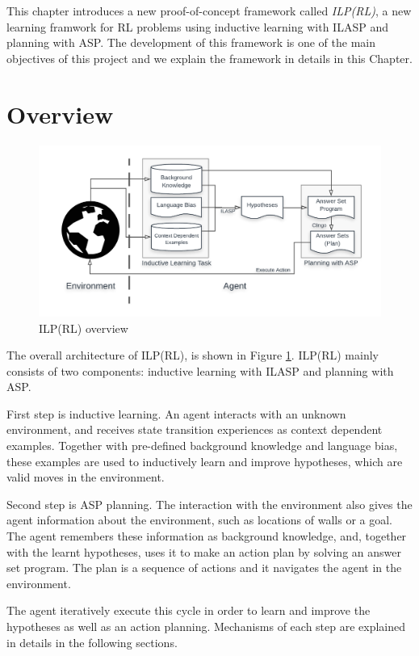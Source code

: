 This chapter introduces a new proof-of-concept framework called \textit{ILP(RL)}, a new learning framwork for RL problems using inductive learning with ILASP and planning with ASP.
The development of this framework is one of the main objectives of this project and we explain the framework in details in this Chapter.

\section{Overview}
\label{sec:overview}

\begin{figure}[!htb]
\centering
\includegraphics[width=1.0\textwidth]{./figures/architecture}
\caption{ILP(RL) overview}
\label{fig:ILPRL_overview}
\end{figure}

The overall architecture of ILP(RL), is shown in Figure \ref{fig:ILPRL_overview}. 
ILP(RL) mainly consists of two components: inductive learning with ILASP and planning with ASP. 

First step is inductive learning. An agent interacts with an unknown environment, 
and receives state transition experiences as context dependent examples. 
Together with pre-defined background knowledge and language bias, these examples are used to inductively learn and improve hypotheses, which are valid moves in the environment.

Second step is ASP planning. The interaction with the environment also gives the agent information about the environment, such as locations of walls or a goal. 
The agent remembers these information as background knowledge, and, 
together with the learnt hypotheses, uses it to make an action plan by solving an answer set program.
The plan is a sequence of actions and it navigates the agent in the environment.

The agent iteratively execute this cycle in order to learn and improve the hypotheses as well as an action planning. 
Mechanisms of each step are explained in details in the following sections.

